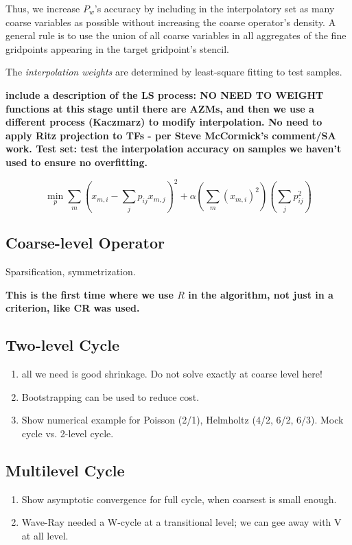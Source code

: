 \documentclass{article}
\begin{document}
Thus, we increase $P_w$'s accuracy by including in the interpolatory set as many coarse variables as possible without increasing the coarse operator's density. A general rule is to use the union of all coarse variables in all aggregates of the fine gridpoints appearing in the target gridpoint's stencil.

The \emph{interpolation weights} are determined by least-square fitting to test samples.

{\bf include a description of the LS process: NO NEED TO WEIGHT functions at this stage until there are AZMs, and then we use a different process (Kaczmarz) to modify interpolation. No need to apply Ritz projection to TFs - per Steve McCormick's comment/SA work.
Test set: test the interpolation accuracy on samples we haven't used to ensure no overfitting.
}

\begin{equation}
	\min_p \sum_m \left( x_{m,i} - \sum_j p_{ij} x_{m,j} \right)^2 + \alpha \left( \sum_m (x_{m,i})^2 \right) \left(\sum_j p_{ij}^2\right) 
\end{equation}

\subsection{Coarse-level Operator}
\label{sec:coarse_operator}
Sparsification, symmetrization.

{\bf This is the first time where we use $R$ in the algorithm, not just in a criterion, like CR was used.}

\subsection{Two-level Cycle}
\label{sec:two_level}

{\bf
\begin{enumerate}
\item all we need is good shrinkage. Do not solve exactly at coarse level here!
\item Bootstrapping can be used to reduce cost.
\item Show numerical example for Poisson (2/1), Helmholtz (4/2, 6/2, 6/3). Mock cycle vs. 2-level cycle.
\end{enumerate}
}

\subsection{Multilevel Cycle}
{\bf
\begin{enumerate}
\item Show asymptotic convergence for full cycle, when coarsest is small enough.
\item Wave-Ray needed a W-cycle at a transitional level; we can gee away with V at all level.
\end{enumerate}
}
\end{document}
